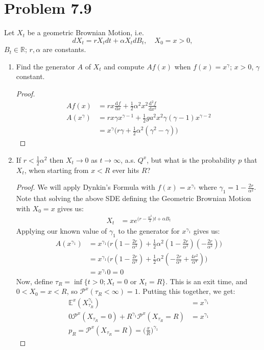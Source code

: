 \documentclass[11pt]{article}
\newcommand{\bbr}{\mathbb{R}}
\renewcommand{\P}{\mathbb{P}}
\newcommand{\ga}{\alpha}
\newcommand{\gc}{y}
\renewcommand{\gc}{\gamma}
\newcommand{\mrm}{\mathrm}
\newcommand{\diff}{\mrm{d}}
\newcommand{\deriv}[3][]{%
  \ensuremath{\frac{\diff^{#1} {#2}}{\diff {#3}^{#1}}}}
\renewcommand{\to}{\longrightarrow}
\renewcommand{\P}{\mathcal{P}}
\newcommand{\E}{\mathbb{E}}
\begin{document}
 \section*{Problem 7.9}
 Let $X_t$ be a geometric Brownian Motion, i.e.
 $$
d X _ { t } = r X _ { t } d t + \alpha X _ { t } d B _ { t } , \quad X _ { 0 } = x > 0,
$$ $B_t \in \bbr$; $r, \ga$ are constants.
\begin{enumerate}
\item Find the generator $A$ of $X_t$ and compute $Af(x)$ when $f(x) = x^\gc$; $x>0$, $\gc$ constant.  
\begin{proof}
\begin{align*}
Af(x) &= r x \deriv{f}{x} + \frac{1}{2} \ga^2 x^2 \deriv[2]{f}{x}\\
A(x^\gc)&=r x \gc x^{\gc-1} + \frac{1}{2} ga^2 x^2 \gc (\gc-1) x^{\gc-2}\\
&= x^\gc \Big( r \gc + \frac{1}{2} \ga^2  ( \gc^2 - \gc) \Big)
\end{align*}
\end{proof}
\item If $r< \frac{1}{2} \ga^2$ then $X_t \to 0$ as $t \to \infty$, a.s. $Q^x$, but what is the probability $p$ that $X_t$, when starting  from $x< R$ ever hits $R$?
\begin{proof}
We will apply Dynkin's Formula with $f(x) = x^{\gc_1}$ where $\gc_1=1-\frac{2r}{\ga^2}$.  Note that solving the above SDE defining the Geometric Brownian Motion with $X_0=x$ gives us:
\begin{align*}
X_t &= xe^{\big(r-\frac{\ga^2}{2}\big)t+ \ga B_t}
\end{align*}
Applying our known value of $\gc_1$ to the generator for $x^{\gc_1}$ gives us:
\begin{align*}
A(x^{\gc_1}) &= x^{\gc_1}\Big( r (1-\frac{2r}{\ga^2}) + \frac{1}{2}\ga^2 (1-\frac{2r}{\ga^2})(-\frac{2r}{\ga^2}) \Big)\\
&= x^{\gc_1}\Big( r (1-\frac{2r}{\ga^2}) + \frac{1}{2}\ga^2 (-\frac{2r}{\ga^2}+\frac{4r^2}{\ga^4}) \Big) \\
&= x^{\gc_1} 0 = 0
\end{align*}
Now, define $\tau_R = \inf\{t>0;  X_t = 0 \text{ or }X_t = R\}$.  This is an exit time, and $0<X_0=x<R$, so $\P^x(\tau_R<\infty)=1$.  Putting this together, we get:
\begin{align*}
\E^x(X_{\tau_R}^{\gc_1}) &= x^{\gc_1}\\
0 \P^x(X_{\tau_R}=0) + R^{\gc_1} \P^x(X_{\tau_R}=R) &= x^{\gc_1}\\
p_R =  \P^x(X_{\tau_R}=R) =\bigg( \frac{x}{R}\bigg) ^{\gc_1}

\end{align*}
\end{proof}
\end{enumerate}
\end{document}
